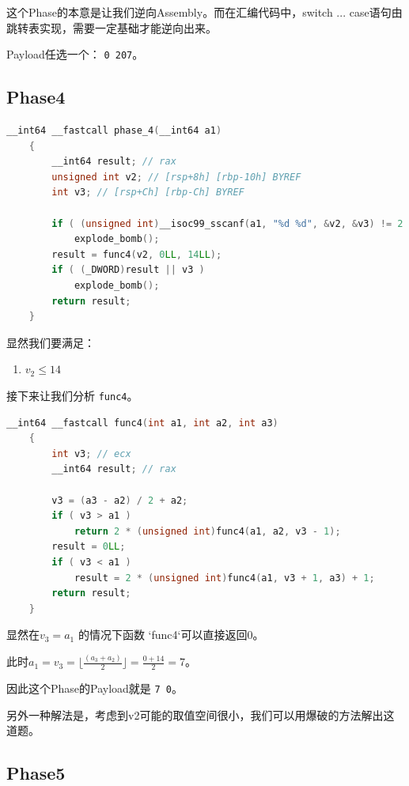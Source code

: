 \documentclass[a4pper,12pt,onecolumn]{article}
\begin{document}
这个Phase的本意是让我们逆向Assembly。而在汇编代码中，switch ... case语句由跳转表实现，需要一定基础才能逆向出来。

Payload任选一个： \texttt{0 207}。

\subsection{Phase4}

\begin{lstlisting}[language=c]
    __int64 __fastcall phase_4(__int64 a1)
    {
        __int64 result; // rax
        unsigned int v2; // [rsp+8h] [rbp-10h] BYREF
        int v3; // [rsp+Ch] [rbp-Ch] BYREF

        if ( (unsigned int)__isoc99_sscanf(a1, "%d %d", &v2, &v3) != 2 || v2 > 14 )
            explode_bomb();
        result = func4(v2, 0LL, 14LL);
        if ( (_DWORD)result || v3 )
            explode_bomb();
        return result;
    }
\end{lstlisting}

显然我们要满足：

\begin{enumerate}
    \item $ v_2 \leq 14 $
\end{enumerate}

接下来让我们分析 \texttt{func4}。

\begin{lstlisting}[language=c]
    __int64 __fastcall func4(int a1, int a2, int a3)
    {
        int v3; // ecx
        __int64 result; // rax

        v3 = (a3 - a2) / 2 + a2;
        if ( v3 > a1 )
            return 2 * (unsigned int)func4(a1, a2, v3 - 1);
        result = 0LL;
        if ( v3 < a1 )
            result = 2 * (unsigned int)func4(a1, v3 + 1, a3) + 1;
        return result;
    }
\end{lstlisting}

显然在$ v_3=a_1 $ 的情况下函数 `func4`可以直接返回0。

此时$ a_1 = v_3 = \lfloor{\frac{(a_3 + a_2)}{2}}\rfloor=\frac{0+14}{2}=7 $。

因此这个Phase的Payload就是 \texttt{7 0}。

另外一种解法是，考虑到v2可能的取值空间很小，我们可以用爆破的方法解出这道题。

\subsection{Phase5}
\end{document}
